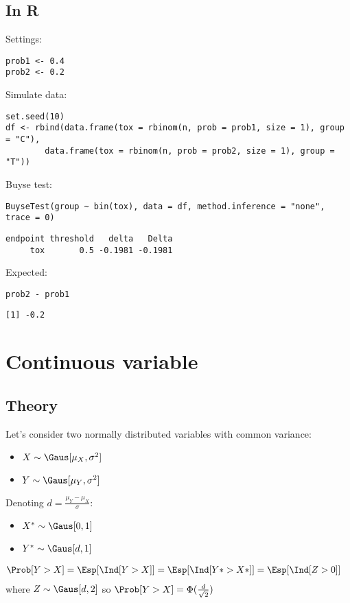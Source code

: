 \documentclass{article}
\begin{document}
\subsection{In R}
\label{sec:orgaa5aa4b}
Settings:
\lstset{language=r,label= ,caption= ,captionpos=b,numbers=none}
\begin{lstlisting}
prob1 <- 0.4
prob2 <- 0.2
\end{lstlisting}

Simulate data:
\lstset{language=r,label= ,caption= ,captionpos=b,numbers=none}
\begin{lstlisting}
set.seed(10)
df <- rbind(data.frame(tox = rbinom(n, prob = prob1, size = 1), group = "C"),
	    data.frame(tox = rbinom(n, prob = prob2, size = 1), group = "T"))
\end{lstlisting}

Buyse test:
\lstset{language=r,label= ,caption= ,captionpos=b,numbers=none}
\begin{lstlisting}
BuyseTest(group ~ bin(tox), data = df, method.inference = "none", trace = 0)
\end{lstlisting}
\begin{verbatim}
endpoint threshold   delta   Delta
     tox       0.5 -0.1981 -0.1981
\end{verbatim}

Expected:
\lstset{language=r,label= ,caption= ,captionpos=b,numbers=none}
\begin{lstlisting}
prob2 - prob1
\end{lstlisting}

\begin{verbatim}
[1] -0.2
\end{verbatim}

\clearpage

\section{Continuous variable}
\label{sec:orgb9cd910}

\subsection{Theory}
\label{sec:org5628198}
Let's consider two normally distributed variables with common variance:
\begin{itemize}
\item \(X \sim \Gaus[\mu_X,\sigma^2]\)
\item \(Y \sim \Gaus[\mu_Y,\sigma^2]\)
\end{itemize}
Denoting \(d = \frac{\mu_Y-\mu_X}{\sigma}\): 
\begin{itemize}
\item \(X^* \sim \Gaus[0,1]\)
\item \(Y^* \sim \Gaus[d,1]\)
\end{itemize}
\begin{align*}
\Prob[Y>X] &= \Esp[\Ind[Y>X]] = \Esp[\Ind[Y*>X*]] = \Esp[\Ind[Z>0]]
\end{align*}
where \(Z \sim \Gaus[d,2]\) so \(\Prob[Y>X] = \Phi(\frac{d}{\sqrt{2}})\)
\end{document}
